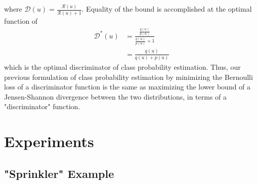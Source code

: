 \documentclass[a4paper,12pt]{article}
\numberwithin{equation}{section}
\begin{document}
where $\mathcal{D}(u)=\frac{\mathcal{R}(u)}{\mathcal{R}(u)+1}$. Equality of the bound is accomplished at the optimal function of
\begin{align*}
\mathcal{D}^*(u)&=\frac{\frac{q(u)}{p(u)}}{\frac{q(u)}{p(u)}+1}\\
&=\frac{q(u)}{q(u)+p(u)}
\end{align*}
which is the optimal discriminator of class probability estimation. Thus, our previous formulation of class probability estimation by minimizing the Bernoulli loss of a discriminator function is the same as maximizing the lower bound of a Jensen-Shannon divergence between the two distributions, in terms of a "discriminator" function.
\newpage
\section{Experiments}
\subsection{"Sprinkler" Example}
\end{document}
